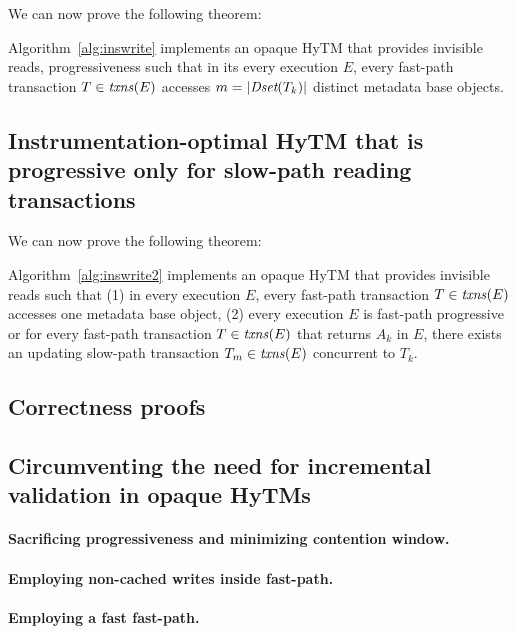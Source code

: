 We can now prove the following theorem:
%
\begin{theorem}
\label{th:inswrite}
Algorithm~\ref{alg:inswrite} implements an opaque HyTM that provides invisible reads, progressiveness
such that in its every execution $E$, every fast-path transaction $T\in \ms{txns}(E)$
accesses $m=|\textit{Dset}(T_k)|$ distinct metadata base objects.
\end{theorem}
%
%

%
\subsection{Instrumentation-optimal HyTM that is progressive only for slow-path reading transactions}
\label{sec:hytm2}
%
We can now prove the following theorem:
%
\begin{theorem}
\label{th:inswrite2}
Algorithm~\ref{alg:inswrite2} implements an opaque HyTM that provides invisible reads
such that (1) in every execution $E$,
every fast-path transaction $T\in \ms{txns}(E)$
accesses one metadata base object,
(2) every execution $E$ is fast-path progressive or for
every fast-path transaction $T\in \ms{txns}(E)$
that returns $A_k$ in $E$, there exists an updating slow-path transaction $T_m \in \ms{txns}(E)$
concurrent to $T_k$.
\end{theorem}
%
%

\subsection{Correctness proofs}
\label{sec:proofs}
%

\subsection{Circumventing the need for incremental validation in opaque HyTMs}
\label{sec:middlepath}
%
\paragraph{Sacrificing progressiveness and minimizing contention window.}

\paragraph{Employing non-cached writes inside fast-path.}

\paragraph{Employing a fast fast-path.}